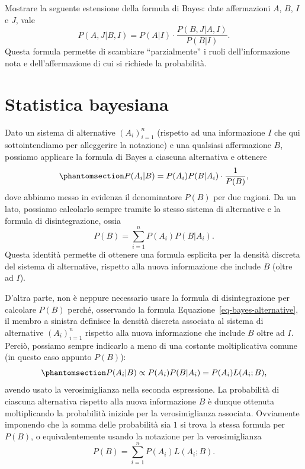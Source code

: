 \documentclass[
  italian,
  letterpaper,
]{book}
\theoremstyle{definition}
\theoremstyle{remark}
\begin{document}
Mostrare la seguente estensione della formula di Bayes: date
affermazioni \(A\), \(B\), \(I\) e \(J\), vale
\[ P( A, J | B, I) = P(A | I) \cdot \frac{ P(B, J | A, I)}{P(B|I)}.\]
Questa formula permette di scambiare ``parzialmente'' i ruoli
dell'informazione nota e dell'affermazione di cui si richiede la
probabilità.

\section{Statistica bayesiana}\label{sec-bayes-stat}

Dato un sistema di alternative \((A_i)_{i=1}^n\) (rispetto ad una
informazione \(I\) che qui sottointendiamo per alleggerire la notazione)
e una qualsiasi affermazione \(B\), possiamo applicare la formula di
Bayes a ciascuna alternativa e ottenere
\begin{equation}\protect\phantomsection\label{eq-bayes-alternative}{ 
P(A_i | B ) = P(A_i)  P(B | A_i ) \cdot \frac{1}{P(B)}, 
}\end{equation} dove abbiamo messo in evidenza il denominatore \(P(B)\)
per due ragioni. Da un lato, possiamo calcolarlo sempre tramite lo
stesso sistema di alternative e la formula di disintegrazione, ossia
\[ P(B) = \sum_{i=1}^n P(A_i)  P(B | A_i ).\] Questa identità permette
di ottenere una formula esplicita per la densità discreta del sistema di
alternative, rispetto alla nuova informazione che include \(B\) (oltre
ad \(I\)).

D'altra parte, non è neppure necessario usare la formula di
disintegrazione per calcolare \(P(B)\) perché, osservando la formula
Equazione~\ref{eq-bayes-alternative}, il membro a sinistra definisce la
densità discreta associata al sistema di alternative \((A_i)_{i=1}^n\)
rispetto alla nuova informazione che include \(B\) oltre ad \(I\).
Perciò, possiamo sempre indicarlo a meno di una costante moltiplicativa
comune (in questo caso appunto \(P(B)\)):
\begin{equation}\protect\phantomsection\label{eq-bayes-prop}{ 
P(A_i | B ) \propto P(A_i)  P(B | A_i )  = P(A_i)L(A_i;B), 
}\end{equation} avendo usato la verosimiglianza nella seconda
espressione. La probabilità di ciascuna alternativa rispetto alla nuova
informazione \(B\) è dunque ottenuta moltiplicando la probabilità
iniziale per la verosimiglianza associata. Ovviamente imponendo che la
somma delle probabilità sia \(1\) si trova la stessa formula per
\(P(B)\), o equivalentemente usando la notazione per la verosimiglianza
\[ P(B) = \sum_{i=1}^n P(A_i) L(A_i; B).\]
\end{document}
